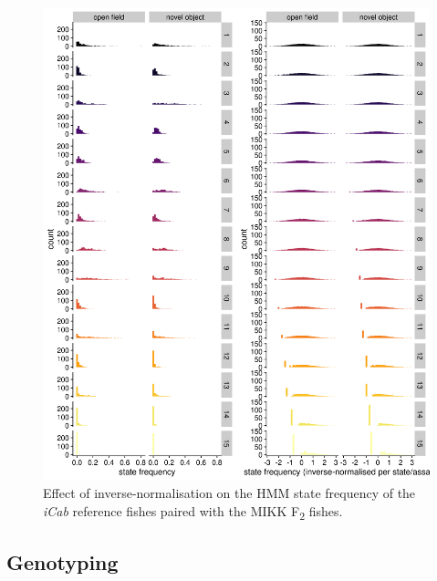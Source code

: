 \documentclass[
]{book}
\begin{document}
\begin{figure}
\includegraphics[width=1\linewidth]{figs/mikk_behaviour/0.08_15_state_freq_F2_sge} \caption{Effect of inverse-normalisation on the HMM state frequency of the \emph{\textcolor{iCab_424B4D}{iCab}} reference fishes paired with the MIKK F\textsubscript{2} fishes.}\label{fig:F2-state-freq-sge}
\end{figure}

\hypertarget{genotyping}{%
\subsection{Genotyping}\label{genotyping}}
\end{document}
